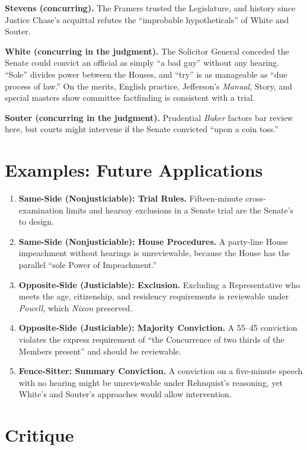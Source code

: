 \documentclass[12pt]{article}
\begin{document}
\textbf{Stevens (concurring).} The Framers trusted the Legislature, and history since Justice Chase's acquittal refutes the ``improbable hypotheticals'' of White and Souter.

\textbf{White (concurring in the judgment).} The Solicitor General conceded the Senate could convict an official as simply ``a bad guy'' without any hearing. ``Sole'' divides power between the Houses, and ``try'' is as manageable as ``due process of law.'' On the merits, English practice, Jefferson's \textit{Manual}, Story, and special masters show committee factfinding is consistent with a trial.

\textbf{Souter (concurring in the judgment).} Prudential \textit{Baker} factors bar review here, but courts might intervene if the Senate convicted ``upon a coin toss.''

\section{Examples: Future Applications}

\begin{enumerate}
\item \textbf{Same-Side (Nonjusticiable): Trial Rules.} Fifteen-minute cross-examination limits and hearsay exclusions in a Senate trial are the Senate's to design.
\item \textbf{Same-Side (Nonjusticiable): House Procedures.} A party-line House impeachment without hearings is unreviewable, because the House has the parallel ``sole Power of Impeachment.''
\item \textbf{Opposite-Side (Justiciable): Exclusion.} Excluding a Representative who meets the age, citizenship, and residency requirements is reviewable under \textit{Powell}, which \textit{Nixon} preserved.
\item \textbf{Opposite-Side (Justiciable): Majority Conviction.} A 55--45 conviction violates the express requirement of ``the Concurrence of two thirds of the Members present'' and should be reviewable.
\item \textbf{Fence-Sitter: Summary Conviction.} A conviction on a five-minute speech with no hearing might be unreviewable under Rehnquist's reasoning, yet White's and Souter's approaches would allow intervention.
\end{enumerate}

\section{Critique}
\end{document}
